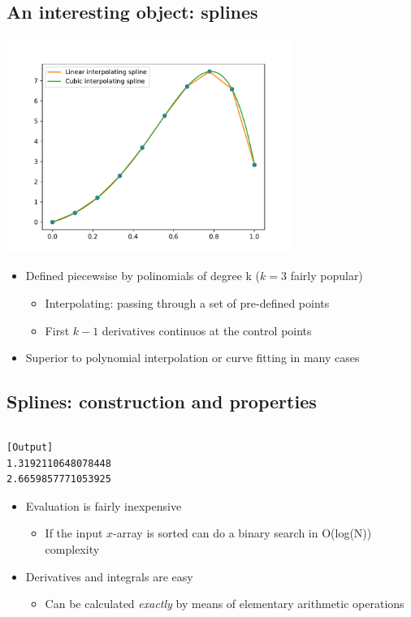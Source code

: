 \subsection{An interesting object: splines}
  
\begin{center}
  \includegraphics[width=0.7\textwidth]{lez6/spline.pdf}
\end{center}  
  
  \begin{itemize}
  \item Defined piecewsise by polinomials of degree k ($k = 3$ fairly popular)
    \begin{itemize}
    \item Interpolating: passing through a set of pre-defined points
    \item First $k-1$ derivatives continuos at the control points
    \end{itemize}
  \item Superior to polynomial interpolation or curve fitting in many cases
  \end{itemize}

\subsection{Splines: construction and properties}

\inputminted{python}{snippets/spline.py}
\begin{verbatim}
[Output]
1.3192110648078448
2.6659857771053925
\end{verbatim}

  \begin{itemize}
  \item Evaluation is fairly inexpensive
    \begin{itemize}
    \item If the input $x$-array is sorted can do a binary search in
      \alert{O(log(N)) complexity}
    \end{itemize}
  \item Derivatives and integrals are easy
    \begin{itemize}
    \item Can be calculated \emph{exactly} by means of elementary
      arithmetic operations
    \end{itemize}
  \end{itemize}
  

